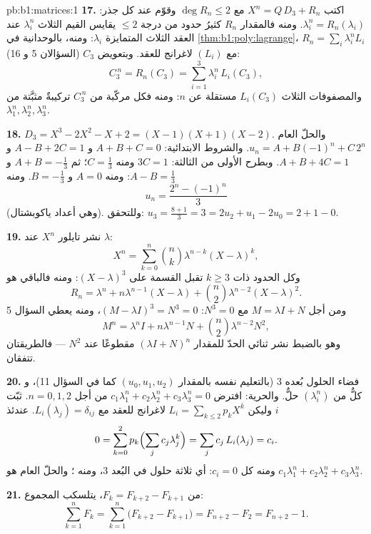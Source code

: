 \begin{solution}{pb:b1:matrices:1}
\textbf{17.} اكتب $X^n = Q\,D_3 + R_n$ مع $\deg R_n \leq 2$
وقوّم عند كل جذر: $\lambda_i^n = R_n(\lambda_i)$. ومنه
فالمقدار $R_n$ كثيرُ حدود من درجة $\leq 2$ يقايس القيم الثلاث
$\lambda_i^n$ عند العقد الثلاث المتمايزة $\lambda_i$: ومنه،
بالوحدانية في \cref{thm:b1:poly:lagrange}، $R_n = \sum_i
\lambda_i^n L_i$ مع $(L_i)$  لاغرانج للعقد.
وبتعويض $C_3$ (السؤالان 5 و 16):
\[
C_3^{\,n} = R_n(C_3) = \sum_{i=1}^{3} \lambda_i^n\,L_i(C_3),
\]
والمصفوفات الثلاث $L_i(C_3)$ مستقلة عن $n$: ومنه فكل
مركّبة من $C_3^{\,n}$ تركيبةٌ مثبَّتة من $\lambda_1^n,
\lambda_2^n, \lambda_3^n$.

\textbf{18.} $D_3 = X^3 - 2X^2 - X + 2 = (X-1)(X+1)(X-2)$.
والحلّ العام $u_n = A + B(-1)^n + C\,2^n$. والشروط
الابتدائية: $A + B + C = 0$ و $A - B + 2C = 1$ و $A + B + 4C = 1$.
وبطرح الأولى من الثالثة: $3C = 1$ ومنه $C = \frac13$؛
ثم $A + B = -\frac13$ و $A - B = \frac13$: ومنه $A = 0$ و $B =
-\frac13$. ومنه
\[
u_n = \frac{2^n - (-1)^n}{3}
\]
(وهي أعداد ياكوبشتال). وللتحقق: $u_3 = \frac{8 + 1}{3} = 3 =
2u_2 + u_1 - 2u_0 = 2 + 1 - 0$.

\textbf{19.} نشر تايلور  $X^n$ عند
$\lambda$:
\[
X^n = \sum_{k=0}^{n} \binom nk \lambda^{n-k}(X - \lambda)^k ,
\]
وكل الحدود ذات $k \geq 3$ تقبل القسمة على $(X -
\lambda)^3$: ومنه فالباقي هو
\[
R_n = \lambda^n + n\lambda^{n-1}(X - \lambda) + \binom
n2\lambda^{n-2}(X - \lambda)^2 .
\]
ومن أجل $M = \lambda I + N$ مع $N^3 = 0$: $(M - \lambda I)^3 = N^3
= 0$، ومنه يعطي السؤال 5
\[
M^n = \lambda^n I + n\lambda^{n-1} N + \binom n2
\lambda^{n-2} N^2 ,
\]
وهو بالضبط نشر ثنائي الحدّ للمقدار $(\lambda I + N)^n$
مقطوعًا عند $N^2$ --- فالطريقتان تتفقان.

\textbf{20.} فضاء الحلول بُعده $3$ (بالتعليم
نفسه بالمقدار $(u_0, u_1, u_2)$ كما في السؤال 11)، و
كلٌّ من $(\lambda_i^n)$ حلٌّ. والحرية: افترض
$c_1\lambda_1^n + c_2\lambda_2^n + c_3\lambda_3^n = 0$ من أجل $n =
0, 1, 2$. ثبّت $i$ وليكن $L_i = \sum_{k \leq 2} p_k X^k$ 
لاغرانج للعقد مع $L_i(\lambda_j) =
\delta_{ij}$. عندئذ
\[
0 = \sum_{k=0}^{2} p_k\Bigl(\sum_j c_j\lambda_j^k\Bigr)
= \sum_j c_j\,L_i(\lambda_j) = c_i .
\]
ومنه كل $c_i = 0$: أي ثلاثة حلول  في البُعد $3$، ومنه
؛ والحلّ العام هو $c_1\lambda_1^n +
c_2\lambda_2^n + c_3\lambda_3^n$.

\textbf{21.} من $F_k = F_{k+2} - F_{k+1}$، يتلسكب المجموع:
\[
\sum_{k=1}^{n} F_k = \sum_{k=1}^{n}\bigl(F_{k+2} - F_{k+1}\bigr)
= F_{n+2} - F_2 = F_{n+2} - 1 .
\]


\end{solution}
